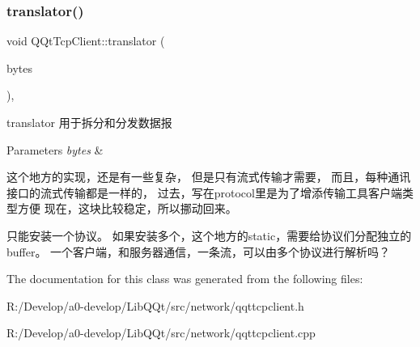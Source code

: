 \subsubsection{\texorpdfstring{translator()}{translator()}}
{\footnotesize\ttfamily void Q\+Qt\+Tcp\+Client\+::translator (\begin{DoxyParamCaption}\item[{const Q\+Byte\+Array \&}]{bytes }\end{DoxyParamCaption})\hspace{0.3cm}{\ttfamily [protected]}, {\ttfamily [virtual]}}



translator 用于拆分和分发数据报 


\begin{DoxyParams}{Parameters}
{\em bytes} & \\
\hline
\end{DoxyParams}
这个地方的实现，还是有一些复杂， 但是只有流式传输才需要， 而且，每种通讯接口的流式传输都是一样的， 过去，写在protocol里是为了增添传输工具客户端类型方便 现在，这块比较稳定，所以挪动回来。

只能安装一个协议。 如果安装多个，这个地方的static，需要给协议们分配独立的buffer。 一个客户端，和服务器通信，一条流，可以由多个协议进行解析吗？

The documentation for this class was generated from the following files\+:\begin{DoxyCompactItemize}
\item 
R\+:/\+Develop/a0-\/develop/\+Lib\+Q\+Qt/src/network/qqttcpclient.\+h\item 
R\+:/\+Develop/a0-\/develop/\+Lib\+Q\+Qt/src/network/qqttcpclient.\+cpp\end{DoxyCompactItemize}
